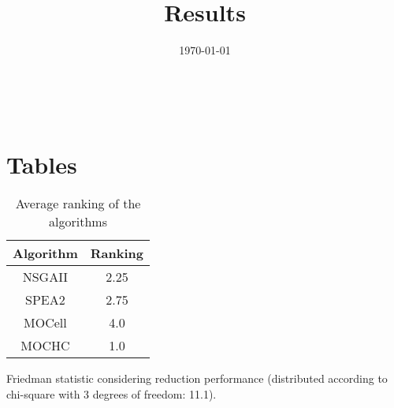 \documentclass{article}
\title{Results}
\author{}
\date{\today}
\begin{document}
\oddsidemargin 0in \topmargin 0in\maketitle
\
\section{Tables}
\begin{table}[!htp]
\centering
\caption{Average ranking of the algorithms}
\begin{tabular}{c|c}
Algorithm&Ranking\\
\hline
NSGAII&2.25\\
SPEA2&2.75\\
MOCell&4.0\\
MOCHC&1.0\\
\end{tabular}
\end{table}


Friedman statistic considering reduction performance (distributed according to chi-square with 3 degrees of freedom: 11.1).
\end{document}
